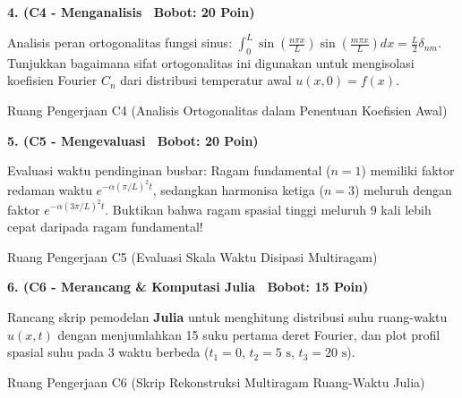 \documentclass[10pt,a4paper]{article}
\begin{document}
\newpage

\noindent\textbf{4. (C4 - Menganalisis \textbar\ Bobot: 20 Poin)}\par\vspace{0.5mm}
{\footnotesize Analisis peran ortogonalitas fungsi sinus: $\int_0^L \sin\left(\frac{n\pi x}{L}\right) \sin\left(\frac{m\pi x}{L}\right) dx = \frac{L}{2} \delta_{nm}$. Tunjukkan bagaimana sifat ortogonalitas ini digunakan untuk mengisolasi koefisien Fourier $C_n$ dari distribusi temperatur awal $u(x,0) = f(x)$.}
\begin{answerbox}{Ruang Pengerjaan C4 (Analisis Ortogonalitas dalam Penentuan Koefisien Awal)}
  \vspace{3.8cm}
\end{answerbox}

\vspace{1.5mm}

\noindent\textbf{5. (C5 - Mengevaluasi \textbar\ Bobot: 20 Poin)}\par\vspace{0.5mm}
{\footnotesize Evaluasi waktu pendinginan busbar: Ragam fundamental ($n=1$) memiliki faktor redaman waktu $e^{-\alpha (\pi/L)^2 t}$, sedangkan harmonisa ketiga ($n=3$) meluruh dengan faktor $e^{-\alpha (3\pi/L)^2 t}$. Buktikan bahwa ragam spasial tinggi meluruh 9 kali lebih cepat daripada ragam fundamental!}
\begin{answerbox}{Ruang Pengerjaan C5 (Evaluasi Skala Waktu Disipasi Multiragam)}
  \vspace{3.8cm}
\end{answerbox}

\vspace{1.5mm}

\noindent\textbf{6. (C6 - Merancang \& Komputasi Julia \textbar\ Bobot: 15 Poin)}\par\vspace{0.5mm}
{\footnotesize Rancang skrip pemodelan \textbf{Julia} untuk menghitung distribusi suhu ruang-waktu $u(x,t)$ dengan menjumlahkan 15 suku pertama deret Fourier, dan plot profil spasial suhu pada 3 waktu berbeda ($t_1=0$, $t_2=5\text{ s}$, $t_3=20\text{ s}$).}
\begin{answerbox}{Ruang Pengerjaan C6 (Skrip Rekonstruksi Multiragam Ruang-Waktu Julia)}
  \vspace{3.8cm}
\end{answerbox}

\vspace{1.5mm}
\end{document}
